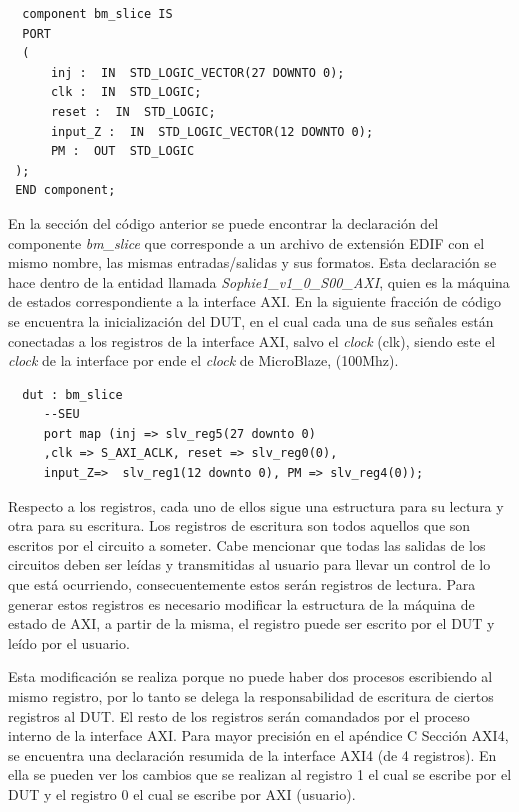 \documentclass[a4paper,openright,12pt]{report}
\begin{document}
    \begin{lstlisting}  
  component bm_slice IS 
  PORT
  (
      inj :  IN  STD_LOGIC_VECTOR(27 DOWNTO 0);
      clk :  IN  STD_LOGIC;
      reset :  IN  STD_LOGIC;
      input_Z :  IN  STD_LOGIC_VECTOR(12 DOWNTO 0);
      PM :  OUT  STD_LOGIC
 );
 END component;

  \end{lstlisting}  
    En la sección del código anterior se puede encontrar la declaración del componente \textit{bm\_slice} que corresponde a un archivo de extensión EDIF con el mismo nombre, las mismas entradas/salidas y sus formatos. Esta declaración se hace dentro de la entidad llamada \textit{Sophie1\_v1\_0\_S00\_AXI}, quien es la máquina de estados correspondiente a la interface AXI.
    En la siguiente fracción de código se encuentra la inicialización del DUT, en el cual cada una de sus señales están conectadas a los registros de la interface AXI, salvo el \textit{clock} (clk), siendo este  el \textit{clock} de la interface por ende el \textit{clock} de MicroBlaze, (100Mhz).
    
  \begin{lstlisting}  
  dut : bm_slice
     --SEU   
     port map (inj => slv_reg5(27 downto 0)
     ,clk => S_AXI_ACLK, reset => slv_reg0(0),
     input_Z=>  slv_reg1(12 downto 0), PM => slv_reg4(0));
   \end{lstlisting} 
   
   
  
   
   Respecto a los registros, cada uno de ellos sigue una estructura para su lectura y otra para su escritura. Los registros de escritura son todos aquellos que son escritos por el circuito a someter.  Cabe mencionar que   todas las salidas de los circuitos deben ser leídas y transmitidas al usuario para llevar un control de lo que está ocurriendo, consecuentemente estos serán registros de lectura. Para generar estos registros es necesario modificar la estructura de la máquina de estado de AXI, a partir de la misma, el registro puede ser escrito por el DUT y leído por el usuario.
   
 Esta modificación se realiza porque no puede haber dos procesos escribiendo al mismo registro, por lo tanto se delega la responsabilidad de escritura de ciertos registros al DUT. El resto de los registros serán comandados por el proceso interno de la interface AXI. Para mayor precisión en el apéndice C Sección AXI4, se encuentra una declaración resumida de la interface AXI4 (de 4 registros). En ella se pueden ver los cambios que se realizan al registro 1 el cual se escribe por el DUT y el registro 0 el cual se escribe  por AXI (usuario). 
 
\end{document}
